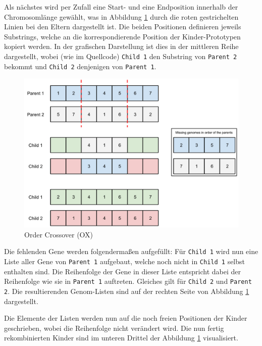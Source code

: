 
\noindent Als nächstes wird per Zufall eine Start- und eine Endposition innerhalb
der Chromosomlänge gewählt, was in Abbildung \ref{fig.recox} durch die roten
gestrichelten Linien bei den Eltern dargestellt ist.
Die beiden Positionen definieren jeweils Substrings, welche an die
korrespondierende Position der Kinder-Prototypen kopiert werden.
In der grafischen Darstellung ist dies in der mittleren Reihe dargestellt, wobei
(wie im Quellcode) {\tt Child 1} den Substring von {\tt Parent 2} bekommt und
{\tt Child 2} denjenigen von {\tt Parent 1}.


\begin{figure}[h!]
  \centering
  \includegraphics[width=1.0\textwidth]{Figures/recox.pdf}
  \caption{Order Crossover (OX)}\label{fig.recox}
\end{figure}

\noindent Die fehlenden Gene werden folgendermaßen aufgefüllt: Für {\tt Child 1}
wird nun eine Liste aller Gene von {\tt Parent 1} aufgebaut, welche noch nicht
in {\tt Child 1} selbst enthalten sind.
Die Reihenfolge der Gene in dieser Liste entspricht dabei der Reihenfolge wie
sie in {\tt Parent 1} auftreten. Gleiches gilt für {\tt Child 2} und
{\tt Parent 2}. Die resultierenden Genom-Listen sind auf der rechten Seite von
Abbildung \ref{fig.recox} dargestellt.


\noindent Die Elemente der Listen werden nun auf die noch freien Positionen der
Kinder geschrieben, wobei die Reihenfolge nicht verändert wird.
Die nun fertig rekombinierten Kinder sind im unteren Drittel der Abbildung
\ref{fig.recox} visualisiert.

